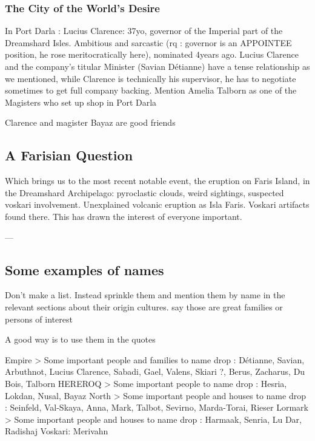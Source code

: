\subsubsection{The City of the World's Desire}

In Port Darla : Lucius Clarence: 37yo, governor of the Imperial part of the Dreamshard Isles. Ambitious and sarcastic (rq : governor is an APPOINTEE position, he rose meritocratically here), nominated 4years ago. Lucius Clarence and the company's titular Minister (Savian Détianne) have a tense relationship as we mentioned, while Clarence is technically his supervisor, he has to negotiate sometimes to get full company backing. Mention Amelia Talborn as one of the Magisters who set up shop in Port Darla

Clarence and magister Bayaz are good friends


\subsection{A Farisian Question}

Which brings us to the most recent notable event, the eruption on Faris Island, in the Dreamshard Archipelago: pyroclastic clouds, weird sightings, suspected voskari involvement. Unexplained volcanic eruption as Isla Faris. Voskari artifacts found there. This has drawn the interest of everyone important.



---



\subsection{Some examples of names}

Don't make a list. Instead sprinkle them and mention them by name in the relevant sections about their origin cultures. say those are great families or persons of interest

A good way is to use them in the quotes

Empire > Some important people and families to name drop : Détianne, Savian, Arbuthnot, Lucius Clarence, Sabadi, Gael, Valens, Skiari ?, Berus, Zacharus, Du Bois, Talborn
HEREROQ > Some important people to name drop : Hesria, Lokdan, Nusal, Bayaz
North > Some important people and houses to name drop : Seinfeld, Val-Skaya, Anna, Mark, Talbot, Sevirno, Marda-Torai, Rieser
Lormark > Some important people and houses to name drop : Harmaak, Senria, Lu Dar, Radishaj
Voskari: Merivahn

